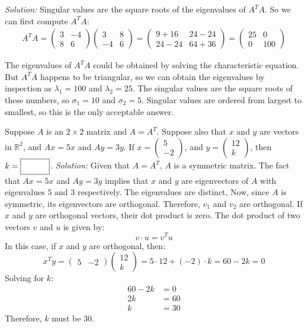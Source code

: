     \ifnum {} {\color{DarkBlue} \textit{Solution:} Singular values are the square roots of the eigenvalues of $A^TA$. So we can first compute \(A^TA\):
    \begin{align}
        A^TA = \begin{pmatrix} 3 & -4 \\ 8 & 6 \end{pmatrix} \begin{pmatrix} 3 & 8 \\ -4 & 6 \end{pmatrix} 
        = \begin{pmatrix} 9 + 16 & 24 - 24 \\ 24 - 24 & 64+36 \end{pmatrix}
        = \begin{pmatrix} 25 & 0 \\ 0 & 100 \end{pmatrix}
    \end{align} 
    
    The eigenvalues of \(A^TA\) could be obtained by solving the characteristic equation. But $A^TA$ happens to be triangular, so we can obtain the eigenvalues by inspection as $\lambda_1 = 100$ and $\lambda_2 = 25$. The singular values are the square roots of these numbers, so $\sigma_1 = 10$ and $\sigma_2 = 5$. Singular values are ordered from largest to smallest, so this is the only acceptable answer. } \fi    
\fi 
\ifnum {}
    Suppose $A$ is an $2\times 2$ matrix and $A=A^T$. Suppose also that $x$ and $y$ are vectors in $\mathbb R^2$, and $Ax = 5x$ and $Ay = 3y$. If $x=\begin{pmatrix} 5\\-2\end{pmatrix}$, and $y=\begin{pmatrix} 12\\k\end{pmatrix}$, then $k=\framebox{\strut\hspace{1cm}}$. 
    \ifnum {} {\color{DarkBlue} \textit{Solution:} Given that \(A = A^T\), \(A\) is a symmetric matrix. The fact that \(Ax = 5x\) and \(Ay = 3y\) implies that \(x\) and \(y\) are eigenvectors of \(A\) with eigenvalues \(5\) and \(3\) respectively. The eigenvalues are distinct, Now, since \(A\) is symmetric, its eigenvectors are orthogonal. Therefore, \(v_1\) and \(v_2\) are orthogonal. If \(x\) and \(y\) are orthogonal vectors, their dot product is zero. The dot product of two vectors \(v\) and \(u\) is given by:
    \[ v \cdot u = v^T u \]
    In this case, if \(x\) and \(y\) are orthogonal, then:
    \[ x^T y = \begin{pmatrix} 5 & -2 \end{pmatrix} \begin{pmatrix} 12 \\ k \end{pmatrix} = 5 \cdot 12 + (-2) \cdot k = 60 - 2k = 0 \]
    Solving for \(k\):
    \begin{align*}
        60 - 2k &= 0 \\ 
        2k &= 60 \\
        k &= 30 
    \end{align*}
    Therefore, \(k\) must be \(30\). } \fi      
